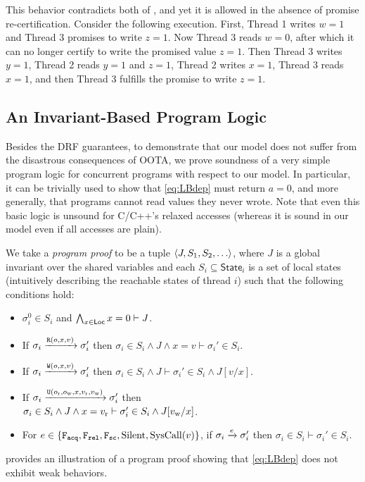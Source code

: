 \noindent This behavior contradicts both of , and yet it is allowed in the
absence of promise re-certification.  Consider the following execution.  First, Thread 1 writes $w=1$
and Thread 3 promises to write $z=1$.  Now Thread 3 reads $w=0$, after which it can no longer
certify to write the promised value $z=1$.  Then Thread 3 writes $y=1$, Thread 2 reads $y=1$ and
$z=1$, Thread 2 writes $x=1$, Thread 3 reads $x=1$, and then Thread 3 fulfills the promise to write
$z=1$.



\subsection{An Invariant-Based Program Logic}
\label{sec:invariant}
Besides the DRF guarantees, to demonstrate that our model does not suffer from
the disastrous consequences of OOTA, 
we prove soundness of a very simple program logic for concurrent programs with respect to our model.
In particular, it can be trivially used to show that \ref{eq:LBdep} must return $a=0$,
and more generally, that programs cannot read values they never wrote.
Note that even this basic logic is unsound for C/C++'s relaxed accesses
(whereas it is sound in our model even if all accesses are plain).


We take a \emph{program proof} to be a tuple ${\langle{J,S_1,S_2,\ldots}\rangle}$, 
where $J$ is a global invariant over the shared variables
and each $S_i \subseteq \textsf{State}_i$ is a set of local states 
(intuitively describing the reachable states of thread $i$) such that the following conditions hold:
\begin{itemize}
  \setlength\itemsep{-2pt}
\item $\sigma_i^0 \in S_i$
and $\bigwedge_{x\in{\mathsf{Loc}}} x=0 \vdash J$.
\item
If $\sigma_i \xrightarrow{\texttt{R}(o,x,v)} \sigma_i'$ then
$\sigma_i\in S_i \land J \land x = v \vdash \sigma_i'\in S_i$.
\item
If $\sigma_i \xrightarrow{\texttt{W}(o,x,v)} \sigma_i'$ then
$\sigma_i\in S_i \land J \vdash \sigma_i'\in S_i \land J[v/x]$.
\item
If $\sigma_i \xrightarrow{\texttt{U}(o_{\text{r}},o_{\text{w}},x,v_{\text{r}},v_{\text{w}})} \sigma_i'$ then \\
$\sigma_i\in S_i \land J \land x = v_{\text{r}} \vdash \sigma_i'\in S_i \land J[v_{\text{w}}/x]$.
\item
For $e\in \{\texttt{F}_{\texttt{acq}},\texttt{F}_{\texttt{rel}},\texttt{F}_{\texttt{sc}},{\text{Silent}},{\text{SysCall}(v)}\}$,
if $\sigma_i \xrightarrow{e} \sigma_i'$ then
 $\sigma_i\in S_i \vdash \sigma_i'\in S_i$.
\end{itemize}
 provides an illustration of a program proof showing that \ref{eq:LBdep}
 does not exhibit weak behaviors.

